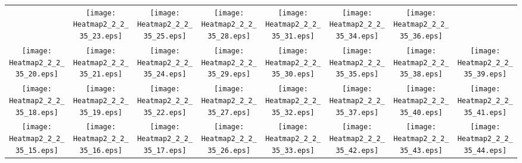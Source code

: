 \documentclass{standalone}
\begin{document}
\renewcommand{\arraystretch}{0}
\setlength{\tabcolsep}{0pt}
\begin{tabular}{ *8{c} }
 & \texttt{[image: Heatmap2\_2\_2\_35\_23.eps]} & \texttt{[image: Heatmap2\_2\_2\_35\_25.eps]} & \texttt{[image: Heatmap2\_2\_2\_35\_28.eps]} & \texttt{[image: Heatmap2\_2\_2\_35\_31.eps]} & \texttt{[image: Heatmap2\_2\_2\_35\_34.eps]} & \texttt{[image: Heatmap2\_2\_2\_35\_36.eps]} &  \\
\texttt{[image: Heatmap2\_2\_2\_35\_20.eps]} & \texttt{[image: Heatmap2\_2\_2\_35\_21.eps]} & \texttt{[image: Heatmap2\_2\_2\_35\_24.eps]} & \texttt{[image: Heatmap2\_2\_2\_35\_29.eps]} & \texttt{[image: Heatmap2\_2\_2\_35\_30.eps]} & \texttt{[image: Heatmap2\_2\_2\_35\_35.eps]} & \texttt{[image: Heatmap2\_2\_2\_35\_38.eps]} & \texttt{[image: Heatmap2\_2\_2\_35\_39.eps]} \\
\texttt{[image: Heatmap2\_2\_2\_35\_18.eps]} & \texttt{[image: Heatmap2\_2\_2\_35\_19.eps]} & \texttt{[image: Heatmap2\_2\_2\_35\_22.eps]} & \texttt{[image: Heatmap2\_2\_2\_35\_27.eps]} & \texttt{[image: Heatmap2\_2\_2\_35\_32.eps]} & \texttt{[image: Heatmap2\_2\_2\_35\_37.eps]} & \texttt{[image: Heatmap2\_2\_2\_35\_40.eps]} & \texttt{[image: Heatmap2\_2\_2\_35\_41.eps]} \\
\texttt{[image: Heatmap2\_2\_2\_35\_15.eps]} & \texttt{[image: Heatmap2\_2\_2\_35\_16.eps]} & \texttt{[image: Heatmap2\_2\_2\_35\_17.eps]} & \texttt{[image: Heatmap2\_2\_2\_35\_26.eps]} & \texttt{[image: Heatmap2\_2\_2\_35\_33.eps]} & \texttt{[image: Heatmap2\_2\_2\_35\_42.eps]} & \texttt{[image: Heatmap2\_2\_2\_35\_43.eps]} & \texttt{[image: Heatmap2\_2\_2\_35\_44.eps]} \\

\end{tabular}
\end{document}
